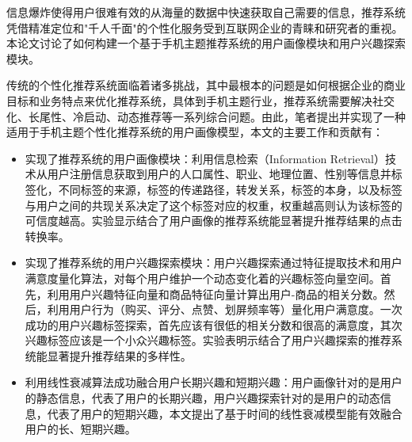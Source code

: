 \begin{cnabstract}
信息爆炸使得用户很难有效的从海量的数据中快速获取自己需要的信息，推荐系统凭借精准定位和"千人千面"的个性化服务受到互联网企业的青睐和研究者的重视。本论文讨论了如何构建一个基于手机主题推荐系统的用户画像模块和用户兴趣探索模块。

传统的个性化推荐系统面临着诸多挑战，其中最根本的问题是如何根据企业的商业目标和业务特点来优化推荐系统，具体到手机主题行业，推荐系统需要解决社交化、长尾性、冷启动、动态推荐等一系列综合问题。由此，笔者提出并实现了一种适用于手机主题个性化推荐系统的用户画像模型，本文的主要工作和贡献有：
\begin{itemize}
	\item 实现了推荐系统的用户画像模块：利用信息检索（Information Retrieval）技术从用户注册信息获取到用户的人口属性、职业、地理位置、性别等信息并标签化，不同标签的来源，标签的传递路径，转发关系，标签的本身，以及标签与用户之间的共现关系决定了这个标签对应的权重，权重越高则认为该标签的可信度越高。实验显示结合了用户画像的推荐系统能显著提升推荐结果的点击转换率。
	\item 实现了推荐系统的用户兴趣探索模块：用户兴趣探索通过特征提取技术和用户满意度量化算法，对每个用户维护一个动态变化着的兴趣标签向量空间。首先，利用用户兴趣特征向量和商品特征向量计算出用户-商品的相关分数。然后，利用用户行为（购买、评分、点赞、划屏频率等）量化用户满意度。一次成功的用户兴趣标签探索，首先应该有很低的相关分数和很高的满意度，其次兴趣标签应该是一个小众兴趣标签。实验表明示结合了用户兴趣探索的推荐系统能显著提升推荐结果的多样性。
	\item 利用线性衰减算法成功融合用户长期兴趣和短期兴趣：用户画像针对的是用户的静态信息，代表了用户的长期兴趣，用户兴趣探索针对的是用户的动态信息，代表了用户的短期兴趣，本文提出了基于时间的线性衰减模型能有效融合用户的长、短期兴趣。
\end{itemize}

\end{cnabstract}

